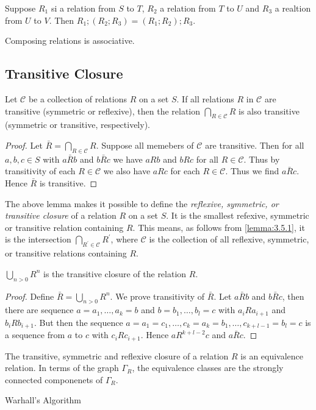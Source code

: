 \begin{proposition}
    Suppose $R_1$ si a relation from $S$ to $T$, $R_2$ a relation from $T$ to $U$ and $R_3$ a realtion from $U$ to $V$.
    Then $R_1;(R_2;R_3) = (R_1;R_2);R_3$.

    Composing relations is associative.
\end{proposition}

\subsection{Transitive Closure}

\begin{lemma}\label{lemma:3.5.1}
    Let $ \mathscr{C} $ be a collection of relations $R$ on a set $S$. If all relations $R$ in $\mathscr{C}$ are transitive (symmetric or reflexive),
    then the relation $ \bigcap_{R \in \mathscr{C}} R$ is also transitive (symmetric or transitive, respectively).
\end{lemma}

\begin{proof}[Proof]
    Let $ \bar{R} = \bigcap_{R \in \mathscr{C}}R $. Suppose all memebers of $ \mathscr{C} $ are transitive. Then for all $ a,b,c \in S $ with $ a\bar{R}b $
    and $ b\bar{R}c $ we have $aRb$ and $bRc$ for all $ R \in \mathscr{C} $. Thus by transitivity of each $ R \in \mathscr{C} $ we also have $ aRc $ for each $R \in \mathscr{C}$.
    Thus we find $ a \bar{R}c $. Hence $ \bar{R} $ is transitive.
\end{proof}

The above lemma makes it possible to define the \emph{reflexive, symmetric, or transitive closure}
of a relation $R$ on a set $S$. It is the smallest refexive, symmetric or transitive
relation containing $R$. This means, as follows from \cref{lemma:3.5.1}, it is the
intersection $ \bigcap_{R^\prime \in \mathscr{C}}R^\prime $, where $ \mathscr{C} $
is the collection of all reflexive, symmetric, or transitive relations containing $R$.

\begin{proposition}
    $ \bigcup_{n>0}R^n $ is the transitive closure of the relation $R$.
\end{proposition}

\begin{proof}[Proof]
    Define $ \bar{R} = \bigcup_{n>0}R^n $. We prove transitivity of $ \bar{R} $. Let $ a\bar{R}b $
    and $ b\bar{R}c $, then there are sequence $ a = a_1,\dots,a_k = b $ and $ b = b_1,\dots,b_l = c $
    with $ a_iRa_{i+1} $ and $ b_iRb_{i+1} $. But then the sequence $ a=a_1=c_1,\dots,c_k=a_k=b_1,\dots,c_{k+l-1}=b_l=c$
    is a sequence from $a$ to $c$ with $ c_iRc_{i+1} $. Hence $ aR^{k+l-2}c $ and $ a\bar{R}c $.
\end{proof}

The transitive, symmetric and reflexive closure of a relation $R$ is an equivalence relation.
In terms of the graph $ \Gamma_R $, the equivalence classes are the strongly connected
componenets of $ \Gamma_R $.

\begin{algorithm}[H]
    Warhall's Algorithm
\end{algorithm}
